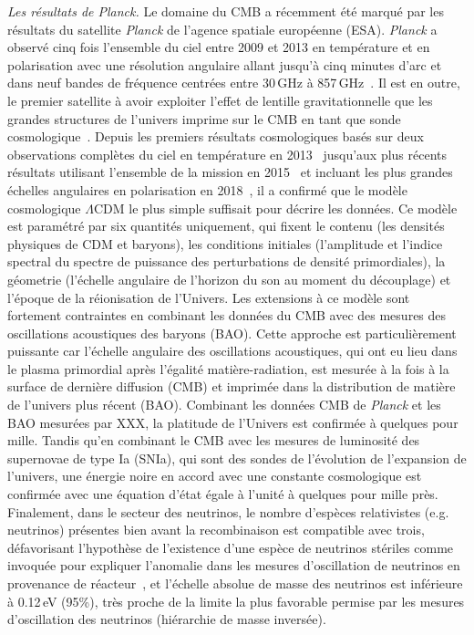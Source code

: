 \emph{Les résultats de Planck.} Le domaine du CMB a récemment été
marqué par les résultats du satellite \emph{Planck} de l'agence
spatiale européenne (ESA). \emph{Planck} a observé cinq fois l'ensemble du ciel entre
2009 et 2013 en température et en polarisation avec une résolution
angulaire allant jusqu'à cinq minutes d'arc et dans neuf bandes de
fréquence centrées entre 30\,GHz à 857\,GHz~. Il est en
outre, le premier satellite à avoir exploiter l'effet de lentille
gravitationnelle que les grandes structures de l'univers imprime sur
le CMB en tant que sonde cosmologique~. Depuis les premiers résultats cosmologiques basés sur
deux observations complètes du ciel en température en
2013~ jusqu'aux plus récents résultats utilisant
l'ensemble de la mission en 2015~ et incluant les
plus grandes échelles angulaires en polarisation en
2018~, il a confirmé que le modèle cosmologique
$\Lambda$CDM le plus simple suffisait pour décrire les données. Ce
modèle est paramétré par six quantités uniquement, qui fixent le
contenu (les densités physiques de CDM et baryons), les conditions
initiales (l'amplitude et l'indice spectral du spectre de puissance
des perturbations de densité primordiales), la géometrie (l'échelle
angulaire de l'horizon du son au moment du découplage) et l'époque de
la réionisation de l'Univers. Les extensions à ce modèle sont
fortement contraintes en combinant les données du CMB avec des mesures
des oscillations acoustiques des baryons (BAO). Cette approche est
particulièrement puissante car 
l'échelle angulaire des oscillations acoustiques, qui ont eu lieu dans
le plasma primordial après l'égalité matière-radiation, est mesurée à
la fois à la surface de dernière diffusion (CMB) et imprimée dans la
distribution de matière de l'univers plus récent (BAO). Combinant les
données CMB de \emph{Planck} et les BAO mesurées par XXX, la platitude
de l'Univers est confirmée à quelques pour mille. Tandis qu'en
combinant le CMB avec les mesures de luminosité des supernovae de type
Ia (SNIa), qui sont des sondes de l'évolution de l'expansion de
l'univers, une énergie noire en accord avec une constante cosmologique
est confirmée avec une équation d'état égale à l'unité à quelques pour
mille près. Finalement, dans le secteur des neutrinos, le nombre
d'espèces relativistes (e.g. neutrinos) présentes bien avant la
recombinaison est compatible avec trois, défavorisant l'hypothèse de
l'existence d'une espèce de neutrinos stériles comme invoquée pour expliquer
l'anomalie dans les mesures d'oscillation de neutrinos en provenance
de réacteur~, et l'échelle absolue de masse des
neutrinos est inférieure à 0.12\,eV (95\%), très proche de la limite
la plus favorable permise par les mesures d'oscillation des neutrinos
(hiérarchie de masse inversée).\\

